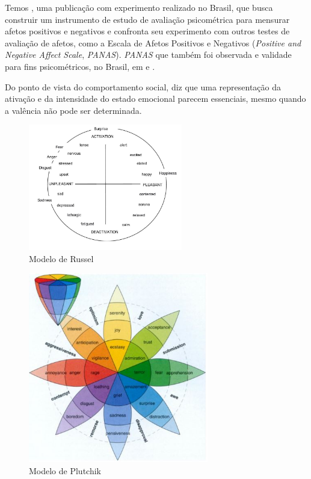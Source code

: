 Temos \cite{emoint3}, uma publicação com experimento realizado no Brasil, que busca construir um instrumento de estudo de avaliação psicométrica para mensurar afetos positivos e negativos e confronta seu experimento com outros testes de avaliação de afetos, como a Escala de Afetos Positivos e Negativos (\textit{Positive and Negative Affect Scale}, \textit{PANAS}). \textit{PANAS} que também foi observada e validade para fins psicométricos, no Brasil, em \cite{panas1} e \cite{panas2}.

Do ponto de vista do comportamento social, \cite{16} diz que uma representação da ativação e da intensidade do estado emocional parecem essenciais, mesmo quando a valência não pode ser determinada.

\begin{figure}[!ht]
\centering
\includegraphics[width=0.6\textwidth]{imagens/russel.JPG}
\caption{\label{fig:russel}Modelo de Russel \cite{25}}
\end{figure}

\begin{figure}[!h]
\centering
\includegraphics[width=0.7\textwidth]{imagens/plutchik.JPG}
\caption{\label{fig:plutchik}Modelo de Plutchik \cite{57}}
\end{figure}

